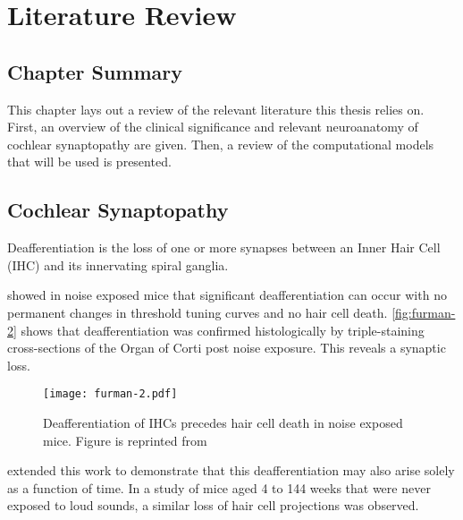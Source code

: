\chapter{Literature Review}
\label{chapter:literaturereview}
\thispagestyle{myheadings}
\graphicspath{{2_LiteratureReview/Figures/}}
\section{Chapter Summary} %
\label{sec:review_summary}
This chapter lays out a review of the relevant literature this thesis relies on. First, an overview of the clinical significance and relevant neuroanatomy of cochlear synaptopathy are given.  Then, a review of the computational models that will be used is presented. 

\section{Cochlear Synaptopathy} %
\label{sec:cochlear_synaptopathy}
Deafferentiation is the loss of one or more synapses between an Inner Hair Cell (IHC) and its innervating spiral ganglia. 

\cite{Kujawa2009Adding} showed in noise exposed mice that significant deafferentiation can occur with no permanent changes in threshold tuning curves and no hair cell death. \autoref{fig:furman-2} shows that deafferentiation was confirmed histologically by triple-staining cross-sections of the Organ of Corti post noise exposure.  This reveals a synaptic loss. 

\begin{figure}[htbp]
	\centering
	\texttt{[image: furman-2.pdf]}
	\caption[Deafferentation of Inner Hair Cells]{Deafferentiation of IHCs precedes hair cell death in noise exposed mice.  Figure is reprinted from~\cite{Furman2013NoiseInduced}}
	\label{fig:furman-2}
\end{figure}


\cite{Sergeyenko2013AgeRelated} extended this work to demonstrate that this deafferentiation may also arise solely as a function of time.  In a study of mice aged 4 to 144 weeks that were never exposed to loud sounds, a similar loss of hair cell projections was observed.


